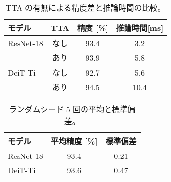 \begin{table}[t]
  \centering
  \caption{TTA の有無による精度差と推論時間の比較。}
  \label{tab:tta}
  \begin{tabular}{lccc}
    \hline
    モデル & TTA & 精度 [\%] & 推論時間[ms] \\
    \hline
    ResNet-18 & なし & 93.4 & 3.2 \\
                & あり & 93.9 & 5.8 \\
    DeiT-Ti    & なし & 92.7 & 5.6 \\
                & あり & 94.5 & 10.4 \\
    \hline
  \end{tabular}
\end{table}

\begin{table}[t]
  \centering
  \caption{ランダムシード 5 回の平均と標準偏差。}
  \label{tab:seed}
  \begin{tabular}{lcc}
    \hline
    モデル & 平均精度 [\%] & 標準偏差 \\
    \hline
    ResNet-18 & 93.4 & 0.21 \\
    DeiT-Ti & 93.6 & 0.47 \\
    \hline
  \end{tabular}
\end{table}
